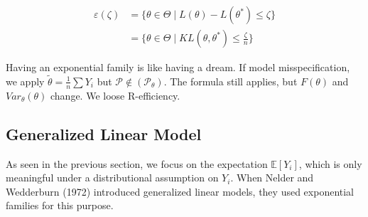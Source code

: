 \begin{corollary}
	\begin{align*}
		\varepsilon(\zeta) &= \{ \theta \in \Theta \mid L(\theta) - L(\theta^*) \leq \zeta \}\\
		&= \{\theta \in \Theta \mid KL(\theta, \theta^*) \leq \frac{\zeta}{n} \}
	\end{align*}
\end{corollary}


\begin{remark}
Having an exponential family is like having a dream.
If model misspecification, we apply $\tilde{\theta} = \frac{1}{n} \sum Y_i$ but $\mathcal{P} \notin (\mathcal{P}_\theta)$. The formula still applies, but $F(\theta)$ and $Var_\theta(\theta)$ change. We loose R-efficiency.	
\end{remark}

\subsection{Generalized Linear Model}

As seen in the previous section, we focus on the expectation $\mathbb{E}[Y_i]$, which is only meaningful under a distributional assumption on $Y_i$. When Nelder and Wedderburn (1972) introduced generalized linear models, they used exponential families for this purpose.

